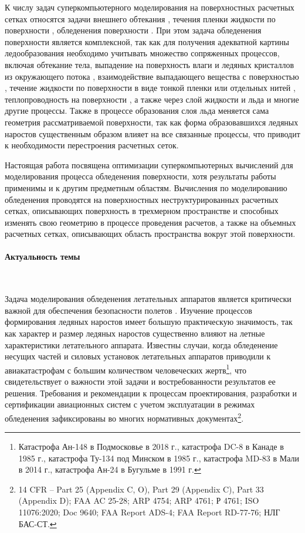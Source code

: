 К числу задач суперкомпьютерного моделирования на поверхностных расчетных сетках относятся задачи внешнего обтекания \cite{Mitin2020Flow}, течения пленки жидкости по поверхности \cite{Li2014Film}, обледенения поверхности \cite{Koshelev2020Ice,Sorokin2020Ice}.
При этом задача обледенения поверхности является комплексной, так как для получения адекватной картины ледообразования необходимо учитывать множество сопряженных процессов, включая обтекание тела, выпадение на поверхность влаги и ледяных кристаллов из окружающего потока \cite{Cui2023Impingement}, взаимодействие выпадающего вещества с поверхностью \cite{Cui2021Impingement}, течение жидкости по поверхности в виде тонкой пленки или отдельных нитей \cite{Alexeenko2013Ice}, теплопроводность на поверхности \cite{Domingos2015IceHeat}, а также через слой жидкости и льда \cite{Xin2013Ice} и многие другие процессы.
Также в процессе образования слоя льда меняется сама геометрия рассматриваемой поверхности, так как форма образовавшихся ледяных наростов существенным образом влияет на все связанные процессы, что приводит к необходимости перестроения расчетных сеток.

Настоящая работа посвящена оптимизации суперкомпьютерных вычислений для моделирования процесса обледенения поверхности, хотя результаты работы применимы и к другим предметным областям.
Вычисления по моделированию обледенения проводятся на поверхностных неструктурированных расчетных сетках, описывающих поверхность в трехмерном пространстве и способных изменять свою геометрию в процессе проведения расчетов, а также на объемных расчетных сетках, описывающих область пространства вокруг этой поверхности.

\paragraph{Актуальность темы} \

Задача моделирования обледенения летательных аппаратов является критически важной для обеспечения безопасности полетов \cite{Raj2020IntroIce}.
Изучение процессов формирования ледяных наростов имеет большую практическую значимость, так как характер и размер ледяных наростов существенно влияют на летные характеристики летательного аппарата.
Известны случаи, когда обледенение несущих частей и силовых установок летательных аппаратов приводили к авиакатастрофам с большим количеством человеческих жертв\footnote[1]{Катастрофа Ан-148 в Подмосковье в 2018 г., катастрофа DC-8 в Канаде в 1985 г., катастрофа Ту-134 под Минском в 1985 г., катастрофа MD-83 в Мали в 2014 г., катастрофа Ан-24 в Бугульме в 1991 г.}, что свидетельствует о важности этой задачи и востребованности результатов ее решения.
Требования и рекомендации к процессам проектирования, разработки и сертификации авиационных систем с учетом эксплуатации в режимах обледенения зафиксированы во многих нормативных документах\footnote[2]{14 CFR -- Part 25 (Appendix C, O), Part 29 (Appendix C), Part 33 (Appendix D); FAA AC 25-28; ARP 4754; ARP 4761; Р 4761; ISO 11076:2020; Doc 9640; FAA Report ADS-4; FAA Report RD-77-76; НЛГ БАС-СТ.}.

